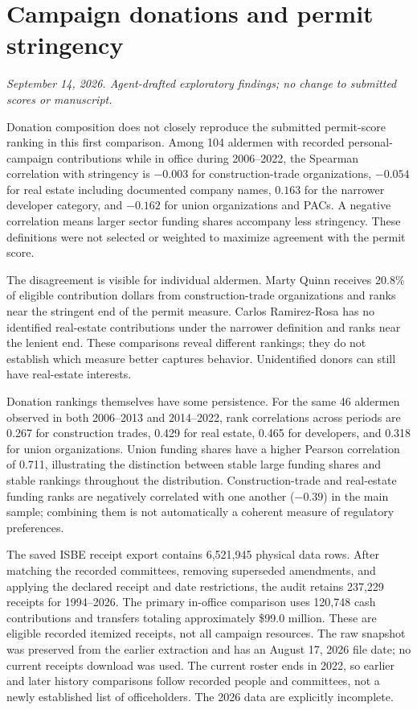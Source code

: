 \clearpage
\section*{Campaign donations and permit stringency}
\textit{September 14, 2026. Agent-drafted exploratory findings; no change to submitted scores or manuscript.}

Donation composition does not closely reproduce the submitted permit-score ranking in this first comparison. Among 104 aldermen with recorded personal-campaign contributions while in office during 2006--2022, the Spearman correlation with stringency is $-0.003$ for construction-trade organizations, $-0.054$ for real estate including documented company names, $0.163$ for the narrower developer category, and $-0.162$ for union organizations and PACs. A negative correlation means larger sector funding shares accompany less stringency. These definitions were not selected or weighted to maximize agreement with the permit score.

The disagreement is visible for individual aldermen. Marty Quinn receives 20.8\% of eligible contribution dollars from construction-trade organizations and ranks near the stringent end of the permit measure. Carlos Ramirez-Rosa has no identified real-estate contributions under the narrower definition and ranks near the lenient end. These comparisons reveal different rankings; they do not establish which measure better captures behavior. Unidentified donors can still have real-estate interests.

Donation rankings themselves have some persistence. For the same 46 aldermen observed in both 2006--2013 and 2014--2022, rank correlations across periods are 0.267 for construction trades, 0.429 for real estate, 0.465 for developers, and 0.318 for union organizations. Union funding shares have a higher Pearson correlation of 0.711, illustrating the distinction between stable large funding shares and stable rankings throughout the distribution. Construction-trade and real-estate funding ranks are negatively correlated with one another ($-0.39$) in the main sample; combining them is not automatically a coherent measure of regulatory preferences.

The saved ISBE receipt export contains 6,521,945 physical data rows. After matching the recorded committees, removing superseded amendments, and applying the declared receipt and date restrictions, the audit retains 237,229 receipts for 1994--2026. The primary in-office comparison uses 120,748 cash contributions and transfers totaling approximately \$99.0 million. These are eligible recorded itemized receipts, not all campaign resources. The raw snapshot was preserved from the earlier extraction and has an August 17, 2026 file date; no current receipts download was used. The current roster ends in 2022, so earlier and later history comparisons follow recorded people and committees, not a newly established list of officeholders. The 2026 data are explicitly incomplete.

